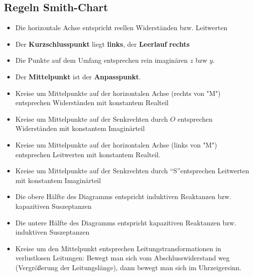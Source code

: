 \documentclass[english]{latex4ei/latex4ei_sheet}
\begin{document}
\begin{sectionbox}
	\subsection{Regeln Smith-Chart}
	\begin{itemize}
		\item Die horizontale Achse entspricht reellen Widerständen bzw. Leitwerten
		\item Der \textbf{Kurzschlusspunkt} liegt \textbf{links}, der \textbf{Leerlauf} \textbf{rechts}
		\item Die Punkte auf dem Umfang entsprechen rein imaginären $z$ bzw $y$.
		\item Der \textbf{Mittelpunkt} ist der \textbf{Anpasspunkt}.
		\item Kreise um Mittelpunkte auf der horizontalen Achse (rechts von "M") entsprechen Widerständen mit konstantem Realteil
		\item Kreise um Mittelpunkte auf der Senkrechten durch $O$ entsprechen Widerständen mit konstantem Imaginärteil
		\item Kreise um Mittelpunkte auf der horizontalen Achse (links von "M") entsprechen Leitwerten mit konstantem Realteil.
		\item Kreise um Mittelpunkte auf der Senkrechten durch \textquotedblleft S\textquotedblright entsprechen Leitwerten mit konstantem Imaginärteil
		\item Die obere Hälfte des Diagramms entspricht induktiven Reaktanzen bzw. kapazitiven Suszeptanzen
		\item Die untere Hälfte des Diagramms entspricht kapazitiven Reaktanzen bzw. induktiven Suszeptanzen
		\item Kreise um den Mittelpunkt entsprechen Leitungstransformationen in verlustlosen Leitungen: Bewegt man sich vom Abschlusswiderstand weg (Vergrößerung der Leitungslänge), dann bewegt man sich im Uhrzeigersinn.
	\end{itemize}
\end{sectionbox}
\end{document}
